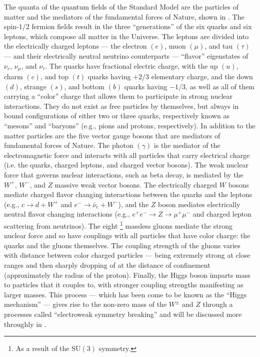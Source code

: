 The quanta of the quantum fields of the Standard Model are the particles of matter and the mediators of the fundamental forces of Nature, shown in .
The spin-$1/2$ fermion fields result in the three ``generations'' of the six quarks and six leptons, which compose all matter in the Universe.
The leptons are divided into the electrically charged leptons --- the electron $(e)$, muon $(\mu)$, and tau $(\tau)$ --- and their electrically neutral neutrino counterparts --- ``flavor'' eigenstates of $\nu_{e}$, $\nu_{\mu}$, and $\nu_{\tau}$.
The quarks have fractional electric charge, with the up $(u)$, charm $(c)$, and top $(t)$ quarks having $+2/3$ elementary charge, and the down $(d)$, strange $(s)$, and bottom $(b)$ quarks having $-1/3$, as well as all of them carrying a ``color'' charge that allows them to participate in strong nuclear interactions.
They do not exist as free particles by themselves, but always in bound configurations of either two or three quarks, respectively known as ``mesons'' and ``baryons'' (e.g., pions and protons, respectively).
In addition to the matter particles are the five vector gauge bosons that are mediators of fundamental forces of Nature.
The photon $(\gamma)$ is the mediator of the electromagnetic force and interacts with all particles that carry electrical charge (i.e. the quarks, charged leptons, and charged vector bosons).
The weak nuclear force that governs nuclear interactions, such as beta decay, is mediated by the $W^{+}$, $W^{-}$, and $Z$ massive weak vector bosons.
The electrically charged $W$ bosons mediate charged flavor changing interactions between the quarks and the leptons (e.g., $c \to d + W^{+}$ and $e^{-} \to \bar{\nu}_{e} + W^{-}$), and the $Z$ boson mediates electrically neutral flavor changing interactions (e.g., $e^{+}e^{-} \to Z \to \mu^{+}\mu^{-}$ and charged lepton scattering from neutrinos).
The eight%
\footnote{As a result of the $\mathrm{SU}(3)$ symmetry.}
massless gluons mediate the strong nuclear force and so have couplings with all particles that have color charge: the quarks and the gluons themselves.
The coupling strength of the gluons varies with distance between color charged particles --- being extremely strong at close ranges and then sharply dropping of at the distance of confinement (approximately the radius of the proton).
Finally, the Higgs boson imparts mass to particles that it couples to, with stronger coupling strengths manifesting as larger masses.
This process --- which has been come to be known as the ``Higgs mechanism'' --- gives rise to the non-zero mass of the $W^{\pm}$ and $Z$ through a processes called ``electroweak symmetry breaking'' and will be discussed more throughly in .


